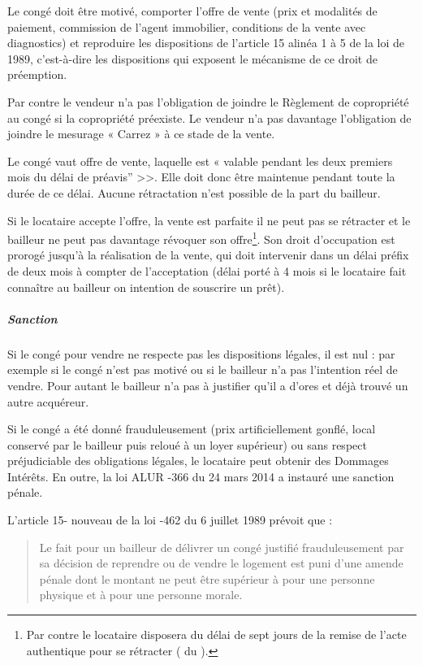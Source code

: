 				Le congé doit être motivé, comporter l’offre de vente (prix et modalités de paiement, commission de l’agent
				immobilier, conditions de la vente avec diagnostics) et reproduire les dispositions de l’article 15 alinéa 1 à
				5 de la loi de 1989, c'est-à-dire les dispositions qui exposent le mécanisme de ce droit de préemption.

				Par contre le vendeur n’a pas l’obligation de joindre le Règlement de copropriété au congé si la copropriété
				préexiste. Le vendeur n’a pas davantage l’obligation de joindre le mesurage « Carrez » à ce stade de la
				vente.
				
				Le congé vaut offre de vente, laquelle est « valable pendant les deux premiers mois du délai de préavis” >>.
				Elle doit donc être maintenue pendant toute la durée de ce délai. Aucune rétractation n'est possible de la
				part du bailleur.
				
				Si le locataire accepte l’offre, la vente est parfaite il ne peut pas se rétracter et le bailleur ne peut pas
				davantage révoquer son offre\footnote{Par contre le locataire disposera du délai de sept jours de la remise de l’acte authentique pour se rétracter ( du \CCH).}. Son droit d’occupation est prorogé jusqu’à la réalisation de la vente, qui
				doit intervenir dans un délai préfix de deux mois à compter de l’acceptation (délai porté à 4 mois si le
				locataire fait connaître au bailleur on intention de souscrire un prêt).
				
				\subparagraph{Sanction}
				
				Si le congé pour vendre ne respecte pas les dispositions légales, il est nul : par exemple si le congé n’est
				pas motivé ou si le bailleur n’a pas l’intention réel de vendre. Pour autant le bailleur n’a pas à justifier qu’il a d’ores et déjà trouvé un autre acquéreur.
				
				Si le congé a été donné frauduleusement (prix artificiellement gonflé, local conservé par le bailleur puis
				reloué à un loyer supérieur) ou sans respect préjudiciable des obligations légales, le locataire peut obtenir
				des Dommages Intérêts. En outre, la loi ALUR -366 du 24 mars 2014 a instauré une sanction pénale.
				
				L'article 15-\IV{} nouveau de la loi -462 du 6 juillet 1989 prévoit que :
				\begin{quote}
					Le fait pour un bailleur de délivrer un congé justifié frauduleusement par sa décision de reprendre ou de
					vendre le logement est puni d'une amende pénale dont le montant ne peut être supérieur à  pour une personne physique et à  pour une personne morale.
				\end{quote}
				
